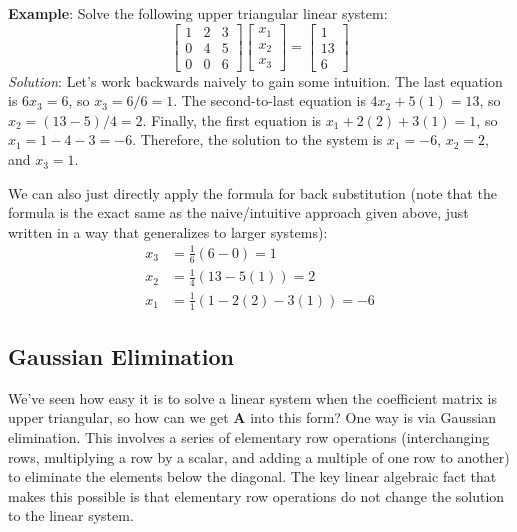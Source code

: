 \begin{exampleBox}
    \textbf{Example}: Solve the following upper triangular linear system:
    \begin{equation*}
        \begin{bmatrix}
        1 & 2 & 3 \\
        0 & 4 & 5 \\
        0 & 0 & 6
        \end{bmatrix}
        \begin{bmatrix}
        x_1 \\ x_2 \\ x_3
        \end{bmatrix}
        =
        \begin{bmatrix}
        1 \\ 13 \\ 6
        \end{bmatrix}
    \end{equation*}
    \emph{Solution}: Let's work backwards naively to gain some intuition. The last equation is $ 6x_3 = 6 $, so $ x_3 = 6/6 = 1 $. The second-to-last equation is $ 4x_2 + 5(1) = 13 $, so $ x_2 = (13 - 5)/4 = 2 $. Finally, the first equation is $ x_1 + 2(2) + 3(1) = 1 $, so $ x_1 = 1 - 4 - 3 = -6 $. Therefore, the solution to the system is $ x_1 = -6 $, $ x_2 = 2 $, and $ x_3 = 1 $.

    We can also just directly apply the formula for back substitution (note that the formula is the exact same as the naive/intuitive approach given above, just written in a way that generalizes to larger systems):
    \begin{align*}
        x_3 & = \frac{1}{6} \left( 6 - 0 \right) = 1 \\
        x_2 & = \frac{1}{4} \left( 13 - 5(1) \right) = 2 \\
        x_1 & = \frac{1}{1} \left( 1 - 2(2) - 3(1) \right) = -6
    \end{align*}
\end{exampleBox}

\subsection{Gaussian Elimination}
We've seen how easy it is to solve a linear system when the coefficient matrix is upper triangular, so how can we get $\mathbf{A}$ into this form? One way is via Gaussian elimination. This involves a series of elementary row operations (interchanging rows, multiplying a row by a scalar, and adding a multiple of one row to another) to eliminate the elements below the diagonal. The key linear algebraic fact that makes this possible is that elementary row operations do not change the solution to the linear system.

